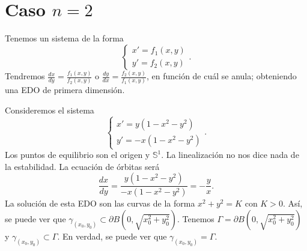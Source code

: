 \section{Caso $\displaystyle n = 2 $}
Tenemos un sistema de la forma 
\[
\begin{cases}
x ' = f_{1}\left(x,y\right) \\
y' = f_{2}\left(x,y\right)
\end{cases}
.\]
Tendremos $\displaystyle \frac{dx}{dy}=\frac{f_{1}\left(x,y\right)}{f_{2}\left(x,y\right)} $ o $\displaystyle \frac{dy}{dx}=\frac{f_{2}\left(x,y\right)}{f_{1}\left(x,y\right)} $, en función de cuál se anula; obteniendo una EDO de primera dimensión. 
\begin{eg}
Consideremos el sistema
\[
\begin{cases}
x' = y\left(1-x^{2}-y^{2}\right) \\
y' = -x\left(1-x^{2}-y^{2}\right)
\end{cases}
.\]
Los puntos de equilibrio son el origen y $\displaystyle \mathbb{S}^{1} $. La linealización no nos dice nada de la estabilidad. La ecuación de órbitas será
\[\frac{dx}{dy}=\frac{y\left(1-x^{2}-y^{2}\right)}{-x\left(1-x^{2}-y^{2}\right)}=-\frac{y}{x} .\]
La solución de esta EDO son las curvas de la forma $\displaystyle x^{2}+y^{2}=K $ con $\displaystyle K >0 $. Así, se puede ver que $\displaystyle \gamma_{\left(x_{0}, y_{0}\right)}\subset\partial B\left(0, \sqrt{x_{0}^{2}+y^{2}_{0}}\right)$. Tenemos $\displaystyle \Gamma = \partial B\left(0, \sqrt{x_{0}^{2}+y^{2}_{0}}\right) $ y $\displaystyle \gamma_{\left(x_{0}, y_{0}\right)}\subset \Gamma  $. En verdad, se puede ver que $\displaystyle \gamma_{\left(x_{0}, y_{0}\right)}=\Gamma  $. 
\end{eg}

